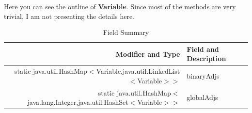 \documentclass{article}
\begin{document}
Here you can see the outline of \textbf{Variable}. Since most of the methods are very trivial, I am not presenting the details here.



\begin{table}[h]
\begin{center}
  \begin{tabular}{ |r | l | }
    \hline
    Modifier and Type & Field and Description \\ \hline
static java.util.HashMap$<$Variable,java.util.LinkedList$<$Variable$>$$>$	&binaryAdjs  \\ \hline
static java.util.HashMap$<$java.lang.Integer,java.util.HashSet$<$Variable$>$$>$	&globalAdjs  \\ \hline

  \end{tabular}
\caption{Field Summary}
\end{center}
\end{table}
\end{document}
